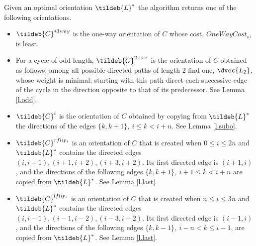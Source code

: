 \begin{definition} Given an optimal orientation $\tildeb{L}^*$  the algorithm returns one of the 
	following orientations.
	\begin{itemize}
		\item $\tildeb{C}^{*1way}$ is the one-way orientation of $C$
		whose cost, $OneWayCost_s$, is least.
		\item For a cycle of odd length, $\tildeb{C}^{2+xx}$ is the orientation of $C$ 
		obtained as follows:
		among all possible directed paths of length 2 find one, $\dvec{L_2}$,
		whose weight is minimal; 
	starting with this path direct each successive edge of the cycle in the direction opposite to that of its predecessor.
		See Lemma \ref{l.odd}.
		\item $\tildeb{C}^i$ is the orientation of $C$ obtained by copying 
		from $\tildeb{L}^*$ the directions
		of the edges $\{k,k+1\},\ i\leq k <i+n$. See Lemma \ref{l.subo}.
		\item 	$\tildeb{C}^{rflip_i}$ is an orientation of $C$ that is created when $0\leq i \leq 2n$ and
		$\tildeb{L}^*$ contains the directed edges 
		$(i,i+1),(i+1,i+2),(i+3,i+2)$. Its first directed edge
		is $(i+1,i)$, and the directions of the following edges $\{k,k+1\},\ i+1\leq k <i+n$
		are copied from $\tildeb{L}^*$.
		See Lemma \ref{l.last}.
		\item 	$\tildeb{C}^{lflip_i}$ is an orientation of $C$ that is created when $n\leq i \leq 3n$ and
$\tildeb{L}^*$ contains the directed edges 
$(i,i-1),(i-1,i-2),(i-3,i-2)$. Its first directed edge
is $(i-1,i)$, and the directions of the following edges $\{k,k-1\},\ i-n<k \leq i-1$,
are copied from $\tildeb{L}^*$.
See Lemma \ref{l.last}.
	\end{itemize}
\end{definition}

